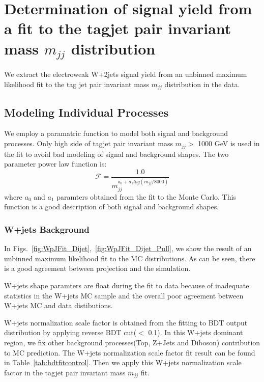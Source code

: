 \clearpage{}
\section{Determination of signal yield from a fit to the tagjet pair invariant mass $m_{jj}$ distribution}
\label{sec:mjj_fit}
We extract the electroweak W+2jets signal yield from an unbinned maximum
likelihood fit to the tag jet pair invariant mass $m_{jj}$ distribution in the data.

\subsection{Modeling Individual Processes}
We employ a paramatric function to model both signal and background processes. Only high side of tagjet pair invariant mass $m_{jj} > $ 1000 GeV is used in the fit to avoid bad modeling of signal and background shapes. The two parameter power law function is:
\begin{equation}
   \mathcal{F} =  \frac{1.0}{m_{jj}^{a_{0} + a_{1}log(m_{jj}/8000)}}
\end{equation}
where $a_{0}$ and $a_{1}$ paramters obtained from the fit to the Monte Carlo.
This function is a good description of both signal and background shapes.

\subsubsection{W+jets Background}
\label{sec:wjetsShape}
In Figs.~\ref{fig:WpJFit_Dijet},~\ref{fig:WpJFit_Dijet_Pull}, we show the result of an unbinned maximum likelihood fit to the MC distributions. As can be seen, there is a good agreement between projection and the simulation.

W+jets shape paramters are float during the fit to data because of inadequate statistics in the W+jets MC sample and the overall poor agreement between W+jets MC and data distibutions.

W+jets normalization scale factor is obtained from the fitting to BDT output distribution by applying reverse BDT cut($<$ 0.1). In this W+jets dominant region, we fix other background processes(Top, Z+Jets and Diboson) contribution to MC prediction. The W+jets normalization scale factor fit result can be found in Table~\ref{tab:bdtfitcontrol}. Then we apply this W+jets normalization scale factor in the tagjet pair invariant mass $m_{jj}$ fit.  

